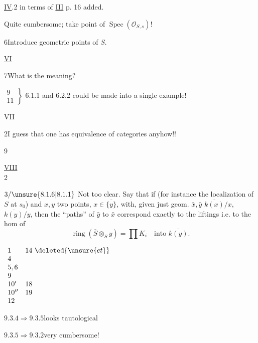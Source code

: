 \uline{IV}\quad {}.2  in terms of \uline{III} p. 16 added.

Quite  cumbersome; take point of
$\operatorname{Spec}(\mathcal O_{S,s})$!

6\quad Introduce geometric points of $S$.

\uline{VI}\quad{}

7\quad What is the meaning?

$\left.\begin{array}{l}9\\11\end{array}\right\}$
6.1.1 and 6.2.2 could be made into a single example!


VII

2\quad I guess that one has equivalence of categories anyhow!!


9

\uline{VIII}\\
\hspace*{3em}2

$3/\unsure{8.1.6|8.1.1}$ Not too clear. Say that if
(for instance the localization of $S$ at $s_0$)
and 
$x,y$ two points, $x\in\overline{\{y\}}$,
 with, given just geom. $\bar x,\bar y$
$\overline{k(x)}/x$, $\overline{k(y)}/y$, then the ``paths'' of $\bar y$ to $\bar x$
correspond exactly to the  liftings
i.e. to the hom of
\[
\operatorname{ring}(\overline S\otimes_S y)=\prod K_i
\quad\text{into }\overline{k(y)}.
\]

\quad
$\begin{array}{ll}
1&14\ \deleted{\unsure{et}}\\
4&\\
5,6&\\
9&\\
10'&18\\
10''&19\\
12&
\end{array}$

$9.3.4\Rightarrow9.3.5$\quad looks tautological

$9.3.5\Rightarrow9.3.2$\quad very cumbersome!

